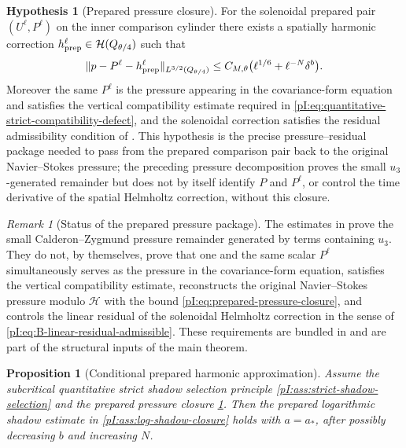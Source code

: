 \documentclass[11pt]{article}
\numberwithin{equation}{section}
\theoremstyle{plain}
\newtheorem{proposition}{Proposition}[section]
\theoremstyle{definition}
\newtheorem{hypothesis}{Hypothesis}[section]
\theoremstyle{remark}
\newtheorem{remark}{Remark}[section]
\newcommand{\calH}{\mathcal H}
\begin{document}
\begin{hypothesis}[Prepared pressure closure]\label{pI:hyp:prepared-pressure-closure}
For the solenoidal prepared pair \((U^\ell,P^\ell)\) on the inner comparison cylinder there exists a spatially harmonic correction \(h_{\rm prep}^\ell\in\calH(Q_{\theta/4})\) such that
\begin{equation}\label{pI:eq:prepared-pressure-closure}
        \|p-P^\ell-h_{\rm prep}^\ell\|_{L^{3/2}(Q_{\theta/4})}
        \le C_{M,\theta}\bigl(\ell^{1/6}+\ell^{-N}\delta^b\bigr).
\end{equation}
Moreover the same \(P^\ell\) is the pressure appearing in the covariance-form equation and satisfies the vertical compatibility estimate required in \eqref{pI:eq:quantitative-strict-compatibility-defect}, and the solenoidal correction satisfies the residual admissibility condition of .  This hypothesis is the precise pressure--residual package needed to pass from the prepared comparison pair back to the original Navier--Stokes pressure; the preceding pressure decomposition proves the small \(u_3\)-generated remainder but does not by itself identify \(P\) and \(P^\ell\), or control the time derivative of the spatial Helmholtz correction, without this closure.
\end{hypothesis}

\begin{remark}[Status of the prepared pressure package]\label{pI:rem:prepared-pressure-not-proved}
The estimates in  prove the small Calderon--Zygmund pressure remainder generated by terms containing \(u_3\).  They do not, by themselves, prove that one and the same scalar \(P^\ell\) simultaneously serves as the pressure in the covariance-form equation, satisfies the vertical compatibility estimate, reconstructs the original Navier--Stokes pressure modulo \(\calH\) with the bound \eqref{pI:eq:prepared-pressure-closure}, and controls the linear residual of the solenoidal Helmholtz correction in the sense of \eqref{pI:eq:B-linear-residual-admissible}.  These requirements are bundled in  and are part of the structural inputs of the main theorem.
\end{remark}


\begin{proposition}[Conditional prepared harmonic approximation]\label{pI:prop:prepared-harmonic-approx}
Assume the subcritical quantitative strict shadow selection principle \cref{pI:ass:strict-shadow-selection} and the prepared pressure closure \cref{pI:hyp:prepared-pressure-closure}.  Then the prepared logarithmic shadow estimate in \cref{pI:ass:log-shadow-closure} holds with \(a=a_*\), after possibly decreasing \(b\) and increasing \(N\).
\end{proposition}
\end{document}
